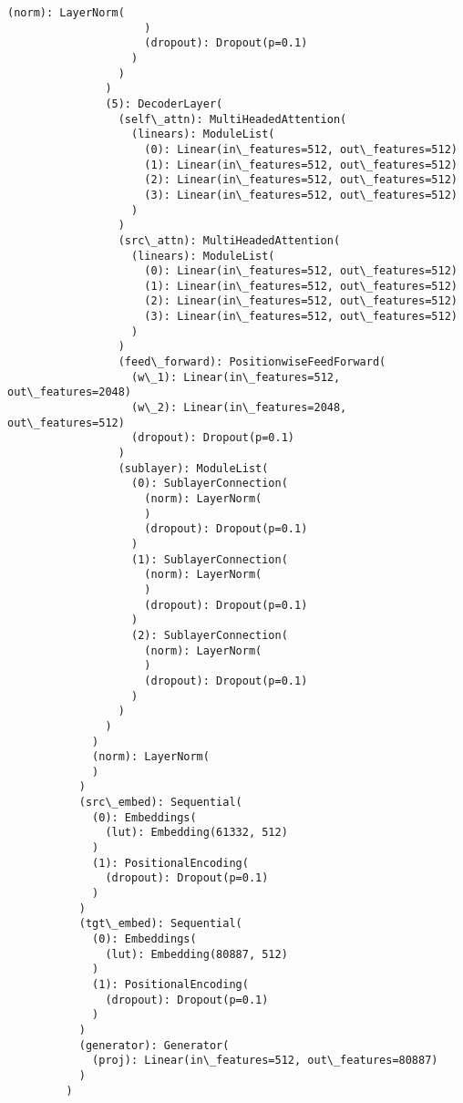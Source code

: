 \documentclass[11pt]{article}
\begin{document}
\begin{Verbatim}[commandchars=\\\{\}]
                     (norm): LayerNorm(
                     )
                     (dropout): Dropout(p=0.1)
                   )
                 )
               )
               (5): DecoderLayer(
                 (self\_attn): MultiHeadedAttention(
                   (linears): ModuleList(
                     (0): Linear(in\_features=512, out\_features=512)
                     (1): Linear(in\_features=512, out\_features=512)
                     (2): Linear(in\_features=512, out\_features=512)
                     (3): Linear(in\_features=512, out\_features=512)
                   )
                 )
                 (src\_attn): MultiHeadedAttention(
                   (linears): ModuleList(
                     (0): Linear(in\_features=512, out\_features=512)
                     (1): Linear(in\_features=512, out\_features=512)
                     (2): Linear(in\_features=512, out\_features=512)
                     (3): Linear(in\_features=512, out\_features=512)
                   )
                 )
                 (feed\_forward): PositionwiseFeedForward(
                   (w\_1): Linear(in\_features=512, out\_features=2048)
                   (w\_2): Linear(in\_features=2048, out\_features=512)
                   (dropout): Dropout(p=0.1)
                 )
                 (sublayer): ModuleList(
                   (0): SublayerConnection(
                     (norm): LayerNorm(
                     )
                     (dropout): Dropout(p=0.1)
                   )
                   (1): SublayerConnection(
                     (norm): LayerNorm(
                     )
                     (dropout): Dropout(p=0.1)
                   )
                   (2): SublayerConnection(
                     (norm): LayerNorm(
                     )
                     (dropout): Dropout(p=0.1)
                   )
                 )
               )
             )
             (norm): LayerNorm(
             )
           )
           (src\_embed): Sequential(
             (0): Embeddings(
               (lut): Embedding(61332, 512)
             )
             (1): PositionalEncoding(
               (dropout): Dropout(p=0.1)
             )
           )
           (tgt\_embed): Sequential(
             (0): Embeddings(
               (lut): Embedding(80887, 512)
             )
             (1): PositionalEncoding(
               (dropout): Dropout(p=0.1)
             )
           )
           (generator): Generator(
             (proj): Linear(in\_features=512, out\_features=80887)
           )
         )
\end{Verbatim}
            
\end{document}
